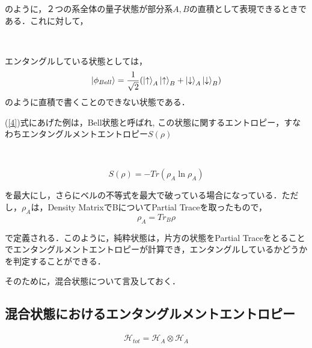 のように，２つの系全体の量子状態が部分系$A,B$の直積として表現できるときである．これに対して，
\begin{empheqboxed}
\
\

エンタングルしている状態としては，
\begin{equation}
    \label{4}
    \ket{\phi_{Bell}}=\frac{1}{\sqrt{2}}(\ket{\uparrow}_{A}\ket{\uparrow}_{B}+\ket{\downarrow}_{A}\ket{\downarrow}_{B})
    \end{equation}
    のように直積で書くことのできない状態である．
\end{empheqboxed}
(\ref{4})式にあげた例は，Bell状態と呼ばれ,
この状態に関するエントロピー，すなわちエンタングルメントエントロピー$S(\rho)$
\begin{empheqboxed}
\

\begin{equation}
S(\rho)=-Tr(\rho_{A}\ln \rho_{A})
\end{equation}
\end{empheqboxed}
を最大にし，さらにベルの不等式を最大で破っている場合になっている．ただし，$\rho_A$は，Density MatrixでBについてPartial Traceを取ったもので，
\begin{equation}
\rho_{A}={Tr}_{B}\rho
\end{equation}

で定義される．このように，純粋状態は，片方の状態をPartial Traceをとることでエンタングルメントエントロピーが計算でき，エンタングルしているかどうかを判定することができる．

そのために，混合状態について言及しておく．
\subsection{混合状態におけるエンタングルメントエントロピー}

\textcolor[rgb]{0.4,0.4,0.4}{\begin{align*}
\mathcal{H}_{tot}=\mathcal{H}_{A}\otimes\mathcal{H}_{A}
\end{align*}}



